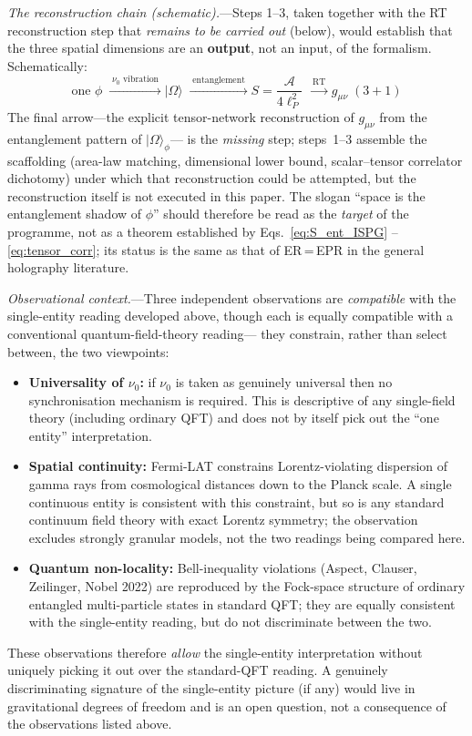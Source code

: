 \documentclass[11pt]{article}
\begin{document}
\textit{The reconstruction chain (schematic).}---Steps
1--3, taken together with the RT reconstruction
step that \emph{remains to be carried out}
(below), would establish that the three spatial
dimensions are an \textbf{output}, not an
input, of the formalism.  Schematically:
\begin{equation}\label{eq:proof_chain}
  \boxed{
  \text{one }\phi
  \;\xrightarrow{\;\nu_0\text{ vibration}\;}
  |\Omega\rangle
  \;\xrightarrow{\;\text{entanglement}\;}
  S = \frac{\mathcal{A}}{4\ell_P^2}
  \;\xrightarrow{\;\text{RT}\;}
  g_{\mu\nu}\;(3{+}1)
  }
\end{equation}
The final arrow---the explicit tensor-network
reconstruction of $g_{\mu\nu}$ from the
entanglement pattern of $|\Omega\rangle_\phi$---%
is the \emph{missing} step; steps~1--3 assemble
the scaffolding (area-law matching,
dimensional lower bound, scalar--tensor
correlator dichotomy) under which that
reconstruction could be attempted, but the
reconstruction itself is not executed in this
paper.  The slogan ``space is the entanglement
shadow of $\phi$'' should therefore be read as
the \emph{target} of the programme, not as a
theorem established by Eqs.~\eqref{eq:S_ent_ISPG}%
--\eqref{eq:tensor_corr}; its status is the
same as that of ER\,=\,EPR in the general
holography literature.

\textit{Observational context.}---Three
independent observations are \emph{compatible}
with the single-entity reading developed above,
though each is equally compatible with a
conventional quantum-field-theory reading---%
they constrain, rather than select between,
the two viewpoints:
\begin{itemize}
  \item \textbf{Universality of $\nu_0$:}\;
    if $\nu_0$ is taken as genuinely universal
    then no synchronisation mechanism is
    required.  This is descriptive of any
    single-field theory (including ordinary
    QFT) and does not by itself pick out the
    ``one entity'' interpretation.
  \item \textbf{Spatial continuity:}\;
    Fermi-LAT constrains Lorentz-violating
    dispersion of gamma rays from cosmological
    distances down to the Planck scale.  A
    single continuous entity is consistent with
    this constraint, but so is any standard
    continuum field theory with exact Lorentz
    symmetry; the observation excludes strongly
    granular models, not the two readings being
    compared here.
  \item \textbf{Quantum non-locality:}\;
    Bell-inequality violations (Aspect,
    Clauser, Zeilinger, Nobel 2022) are
    reproduced by the Fock-space structure of
    ordinary entangled multi-particle states in
    standard QFT; they are equally consistent
    with the single-entity reading, but do not
    discriminate between the two.
\end{itemize}
These observations therefore \emph{allow} the
single-entity interpretation without uniquely
picking it out over the standard-QFT reading.
A genuinely discriminating signature of the
single-entity picture (if any) would live in
gravitational degrees of freedom and is an
open question, not a consequence of the
observations listed above.
\end{document}
